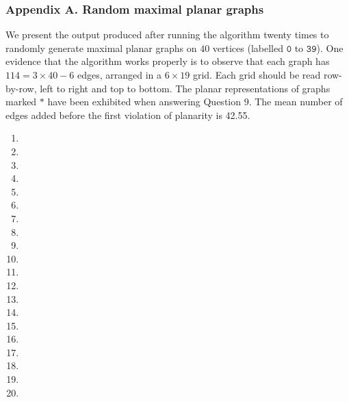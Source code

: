 \documentclass[12pt]{article}
\makeatletter
\newcommand{\verbatimfont}[1]{\def\verbatim@font{#1}}%
\newcommand{\starreditem}{\item[\refstepcounter{enumi}\number\value{enumi}*.]}
\makeatother
\begin{document}
\subsubsection*{Appendix A. \quad Random maximal planar graphs}
We present the output produced after running the algorithm twenty times to
randomly generate maximal planar graphs on \(40\) vertices (labelled
\(\texttt{0}\) to \(\texttt{39}\)). One evidence that the algorithm works
properly is to observe that each graph has \(114 = 3\times 40 - 6\) edges,
arranged in a \(6\times 19\) grid. Each grid should be read row-by-row, left to
right and top to bottom. The planar representations of graphs marked \(\ast\)
have been exhibited when answering Question 9. The mean number of edges added
before the first violation of planarity is 42.55.
\verbatimfont{\footnotesize\ttfamily}
\begin{enumerate}[1.]
    \item  
    \item  
    \item  
    \item  
    \starreditem  
    \item  
    \item  
    \item  
    \starreditem  
    \item  
    \item  
    \starreditem  
    \starreditem  
    \item  
    \item  
    \item  
    \item  
    \item  
    \item  
    \item  
\end{enumerate}
\end{document}
